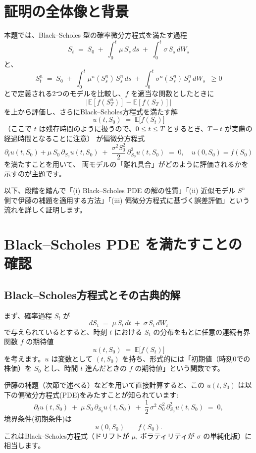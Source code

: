\documentclass[a4paper]{jsarticle}
\begin{document}
  

\section*{証明の全体像と背景}  

本題では、Black--Scholes 型の確率微分方程式を満たす過程  
\[  
  S_t \;=\; S_0 \;+\; \int_0^t \mu\,S_s\,ds \;+\;\int_0^t \sigma\,S_s\,dW_s  
\]  
と、  
\[  
  S_t^n \;=\; S_0 \;+\; \int_0^t \mu^n(S_s^n)\,S_s^n\,ds \;+\;\int_0^t \sigma^n(S_s^n)\,S_s^n\,dW_s \;\;\ge0  
\]  
とで定義される2つのモデルを比較し、$f$ を適当な関数としたときに  
\[  
  \bigl|\mathbb{E}[f(S_T^n)] - \mathbb{E}[f(S_T)]\bigr|  
\]  
を上から評価し、さらにBlack--Scholes方程式を満たす解  
\[  
  u(t,S_0) \;=\; \mathbb{E}\bigl[f(S_t)\bigr]  
\]  
（ここで $t$ は残存時間のように扱うので、$0 \le t\le T$ とするとき、$T-t$ が実際の経過時間となることに注意）  
が偏微分方程式  
\[  
  \partial_t u(t,S_0) + \mu\,S_0\,\partial_{S_0}u(t,S_0)   
  \;+\; \frac{\sigma^2 S_0^2}{2}\,\partial_{S_0}^2 u(t,S_0)  
  \;=\; 0,  
  \quad  
  u(0,S_0)=f(S_0)  
\]  
を満たすことを用いて、  
両モデルの「離れ具合」がどのように評価されるかを示すのが主題です。  

以下、段階を踏んで「(i) Black--Scholes PDE の解の性質」「(ii) 近似モデル $S^n$ 側で伊藤の補題を適用する方法」「(iii) 偏微分方程式に基づく誤差評価」という流れを詳しく証明します。  

\vspace{5mm}  

\section{Black--Scholes PDE を満たすことの確認}  

\subsection{Black--Scholes方程式とその古典的解}  

まず、確率過程 $S_t$ が  
\[  
  dS_t \;=\; \mu\,S_t\,dt \;+\; \sigma\,S_t\,dW_t  
\]  
で与えられているとすると、時刻 $t$ における $S_t$ の分布をもとに任意の連続有界関数 $f$ の期待値  
\[  
  u(t,S_0) \;=\; \mathbb{E}\bigl[f(S_t)\bigr]  
\]  
を考えます。$u$ は変数として $(t, S_0)$ を持ち、形式的には「初期値（時刻0での株価）を $S_0$ とし、時間 $t$ 進んだときの $f$ の期待値」という関数です。  

伊藤の補題（次節で述べる）などを用いて直接計算すると、この $u(t,S_0)$ は以下の偏微分方程式(PDE)をみたすことが知られています:  
\[  
  \partial_t u(t,S_0)   
  \;+\; \mu\,S_0\,\partial_{S_0}u(t,S_0)  
  \;+\; \frac{1}{2}\,\sigma^2 \,S_0^2\,\partial_{S_0}^2 u(t,S_0)  
  \;=\; 0,  
\]  
境界条件(初期条件)は  
\[  
  u(0,S_0) \;=\; f(S_0).  
\]  
これはBlack--Scholes方程式（ドリフトが $\mu$, ボラティリティが $\sigma$ の単純化版）に相当します。  
\end{document}
